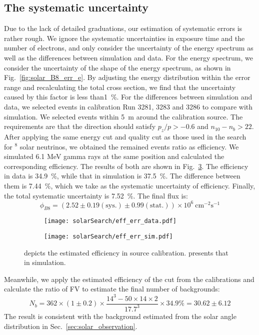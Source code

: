 \subsection{The systematic uncertainty}
Due to the lack of detailed graduations, our estimation of systematic errors is rather rough. We ignore the systematic uncertainties in exposure time and the number of electrons, and only consider the uncertainty of the energy spectrum as well as the differences between simulation and data. For the energy spectrum, we consider the uncertainty of the shape of the energy spectrum, as shown in Fig.~\ref{fig:solar_B8_err_e}. By adjusting the energy distribution within the error range and recalculating the total cross section, we find that the uncertainty caused by this factor is less than\SI{1}{\%}.
For the differences between simulation and data, we selected events in calibration Run 3281, 3283 and 3286 to compare with simulation.
We selected events within \SI{5}{m} around the calibration source. The requirements are that the direction should satisfy $p_z/p > - 0.6$ and $n_{10}-n_{b}>22$. After applying the same energy cut and quality cut as those used in the search for $^8$ solar neutrinos, we obtained the remained events ratio as efficiency. We simulated 6.1 MeV gamma rays at the same position and calculated the corresponding efficiency. The results of both are shown in Fig.~\ref{fig:solar_efficiency}. The efficiency in data is \SI{34.9}{\%}, while that in simulation is \SI{37.5}{\%}. The difference between them is \SI{7.44}{\%}, which we take as the systematic uncertainty of efficiency. Finally, the total systematic uncertainty is \SI{7.52}{\%}. The final flux is:$$\phi_{B8}=(2.52\pm0.19(\text{sys.})\pm0.99(\text{stat.}))\times10^6~\text{cm}^{-2}\text{s}^{-1}$$
\begin{figure}[htbp]
	\centering
	\begin{subfigure}{0.5\textwidth}
		\centering
		\texttt{[image: solarSearch/eff\_err\_data.pdf]}
		\caption{}
		\label{fig:solar_efficiency_data}
	\end{subfigure}%
	\begin{subfigure}{0.5\textwidth}
		\centering
		\texttt{[image: solarSearch/eff\_err\_sim.pdf]}
		\caption{}
		\label{fig:solar_efficiency_sim}
	\end{subfigure}
	\caption{ depicts the estimated efficiency in source calibration.  presents that in simulation.}
	\label{fig:solar_efficiency}
\end{figure}
Meanwhile, we apply the estimated efficiency of the cut from the calibrations and calculate the ratio of FV to estimate the final number of backgrounds:
\begin{equation}
	N_b=362\times(1\pm0.2)\times\frac{14^3-50\times14\times2}{17.7^3}\times34.9\%=30.62\pm6.12
	\label{eq:solar_background_final}
\end{equation}
The result is consistent with the background estimated from the solar angle distribution in Sec.~\ref{sec:solar_observation}.

